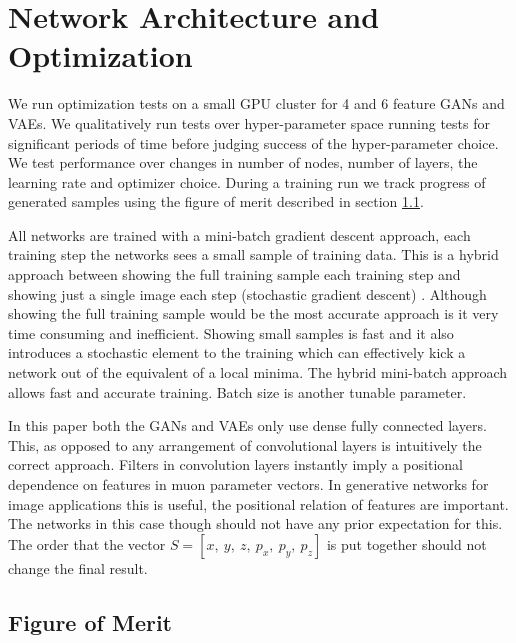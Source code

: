 \documentclass{article}
\begin{document}
\section{Network Architecture and Optimization}

    We run optimization tests on a small GPU cluster for 4 and 6 feature GANs and VAEs. We qualitatively run tests over hyper-parameter space running tests for significant periods of time before judging success of the hyper-parameter choice. We test performance over changes in number of nodes, number of layers, the learning rate and optimizer choice. During a training run we track progress of generated samples using the figure of merit described in section \ref{fom}. 
    
    All networks are trained with a mini-batch gradient descent approach, each training step the networks sees a small sample of training data. This is a hybrid approach between showing the full training sample each training step and showing just a single image each step (stochastic gradient descent) \cite{ruder2016overview}. Although showing the full training sample would be the most accurate approach is it very time consuming and inefficient. Showing small samples is fast and it also introduces a stochastic element to the training which can effectively kick a network out of the equivalent of a local minima. The hybrid mini-batch approach allows fast and accurate training. Batch size is another tunable parameter.
    
    In this paper both the GANs and VAEs only use dense fully connected layers. This, as opposed to any arrangement of convolutional layers is intuitively the correct approach. Filters in convolution layers instantly imply a positional dependence on features in muon parameter vectors. In generative networks for image applications this is useful, the positional relation of features are important. The networks in this case though should not have any prior expectation for this. The order that the vector $S = [x,\:y,\:z,\:p_x,\:p_y,\:p_z]$ is put together should not change the final result. 
    
    \subsection{Figure of Merit}\label{fom}
    
\end{document}
